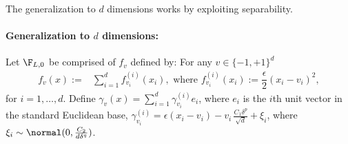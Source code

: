 The generalization to $d$ dimensions works by exploiting separability.
\paragraph{Generalization to $d$ dimensions:}
Let $\F_{L,0}$ be comprised of $f_v$ defined by: For any $v\in \{-1,+1\}^d$
\begin{align*}
  f_v(x) :=& \sum_{i=1}^d f^{(i)}_{v_i}(x_i), \text{ where } f^{(i)}_{v_i}(x_i) := \dfrac{\epsilon}{2} (x_i - v_i)^2,
\end{align*}
for $i=1,\ldots,d$.
Define
$\gamma_v(x) = \sum_{i=1}^d \gamma_{v_i}^{(i)}e_i$, where
$e_i$ is the $i$th unit vector in the standard Euclidean base,
$\gamma_{v_i}^{(i)} = \epsilon(x_i-v_i) - v_i\, \frac{C_1 \delta^p}{\sqrt{d}} + \xi_i$, where $\xi_i \sim \normal(0,\frac{C_2}{d\delta^q})$.

